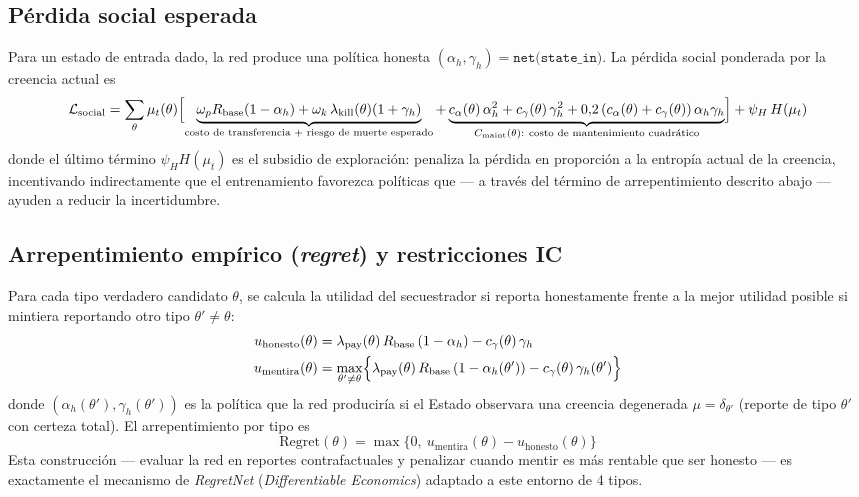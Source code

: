 \documentclass[ecta,nameyear,draft]{econsocart}
\newcommand{\pyvar}[1]{\texttt{#1}}
\begin{document}
\subsection{Pérdida social esperada}

Para un estado de entrada dado, la red produce una política honesta
$(\alpha_h,\gamma_h)=\pyvar{net(state\_in)}$. La pérdida social ponderada por la creencia
actual es
\begin{equation}
\mathcal{L}_{\mathrm{social}} = \sum_{\theta} \mu_t(\theta) \Bigl[
\underbrace{\omega_p R_{\mathrm{base}}(1-\alpha_h) + \omega_k\,\lambda_{\mathrm{kill}}(\theta)(1+\gamma_h)}_{\text{costo de transferencia + riesgo de muerte esperado}}
+ \underbrace{c_\alpha(\theta)\,\alpha_h^2 + c_\gamma(\theta)\,\gamma_h^2 + 0{,}2\,(c_\alpha(\theta)+c_\gamma(\theta))\,\alpha_h\gamma_h}_{C_{\mathrm{maint}}(\theta):\ \text{costo de mantenimiento cuadrático}}
\Bigr]
+ \psi_H\, H(\mu_t)
\label{eq:social-loss}
\end{equation}
donde el último término $\psi_H H(\mu_t)$ es el subsidio de exploración: penaliza la pérdida
en proporción a la entropía actual de la creencia, incentivando indirectamente que el
entrenamiento favorezca políticas que --- a través del término de arrepentimiento descrito
abajo --- ayuden a reducir la incertidumbre.

\subsection{Arrepentimiento empírico (\emph{regret}) y restricciones IC}

Para cada tipo verdadero candidato $\theta$, se calcula la utilidad del secuestrador si
reporta honestamente frente a la mejor utilidad posible si mintiera reportando otro tipo
$\theta' \neq \theta$:
\begin{align}
u_{\mathrm{honesto}}(\theta) &= \lambda_{\mathrm{pay}}(\theta)\, R_{\mathrm{base}}\,(1-\alpha_h) - c_\gamma(\theta)\,\gamma_h \\
u_{\mathrm{mentira}}(\theta) &= \max_{\theta' \neq \theta} \Bigl\{ \lambda_{\mathrm{pay}}(\theta)\, R_{\mathrm{base}}\,(1-\alpha_{h}(\theta')) - c_\gamma(\theta)\,\gamma_h(\theta') \Bigr\}
\end{align}
donde $(\alpha_h(\theta'),\gamma_h(\theta'))$ es la política que la red produciría si el
Estado observara una creencia degenerada $\mu = \delta_{\theta'}$ (reporte de tipo
$\theta'$ con certeza total). El arrepentimiento por tipo es
\begin{equation}
\mathrm{Regret}(\theta) = \max\bigl\{0,\ u_{\mathrm{mentira}}(\theta) - u_{\mathrm{honesto}}(\theta)\bigr\}
\end{equation}
Esta construcción --- evaluar la red en reportes contrafactuales y penalizar cuando mentir es
más rentable que ser honesto --- es exactamente el mecanismo de \emph{RegretNet}
(\emph{Differentiable Economics}) adaptado a este entorno de 4 tipos.
\end{document}
